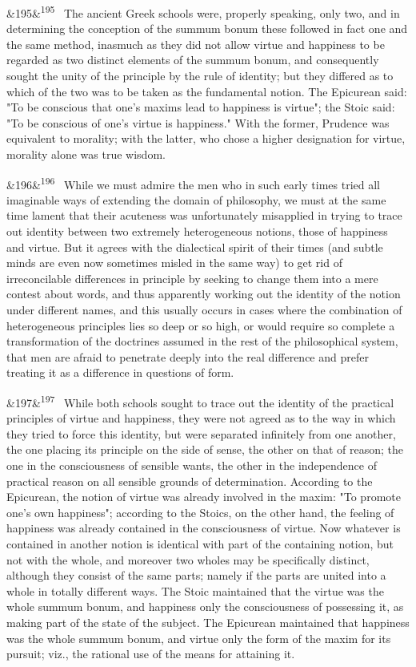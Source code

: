 \documentclass[12pt]{article}
\newcommand{\para}[1][]{\par\noindent\ifx&#1&\else\textsuperscript{\footnotesize #1}~\fi}
\begin{document}
\para[195] The ancient Greek schools were, properly speaking, only two, and in determining the conception of the summum bonum these followed in fact one and the same method, inasmuch as they did not allow virtue and happiness to be regarded as two distinct elements of the summum bonum, and consequently sought the unity of the principle by the rule of identity; but they differed as to which of the two was to be taken as the fundamental notion. The Epicurean said: "To be conscious that one's maxims lead to happiness is virtue"; the Stoic said: "To be conscious of one's virtue is happiness." With the former, Prudence was equivalent to morality; with the latter, who chose a higher designation for virtue, morality alone was true wisdom.

\para[196] While we must admire the men who in such early times tried all imaginable ways of extending the domain of philosophy, we must at the same time lament that their acuteness was unfortunately misapplied in trying to trace out identity between two extremely heterogeneous notions, those of happiness and virtue. But it agrees with the dialectical spirit of their times (and subtle minds are even now sometimes misled in the same way) to get rid of irreconcilable differences in principle by seeking to change them into a mere contest about words, and thus apparently working out the identity of the notion under different names, and this usually occurs in cases where the combination of heterogeneous principles lies so deep or so high, or would require so complete a transformation of the doctrines assumed in the rest of the philosophical system, that men are afraid to penetrate deeply into the real difference and prefer treating it as a difference in questions of form.

\para[197] While both schools sought to trace out the identity of the practical principles of virtue and happiness, they were not agreed as to the way in which they tried to force this identity, but were separated infinitely from one another, the one placing its principle on the side of sense, the other on that of reason; the one in the consciousness of sensible wants, the other in the independence of practical reason on all sensible grounds of determination. According to the Epicurean, the notion of virtue was already involved in the maxim: "To promote one's own happiness"; according to the Stoics, on the other hand, the feeling of happiness was already contained in the consciousness of virtue. Now whatever is contained in another notion is identical with part of the containing notion, but not with the whole, and moreover two wholes may be specifically distinct, although they consist of the same parts; namely if the parts are united into a whole in totally different ways. The Stoic maintained that the virtue was the whole summum bonum, and happiness only the consciousness of possessing it, as making part of the state of the subject. The Epicurean maintained that happiness was the whole summum bonum, and virtue only the form of the maxim for its pursuit; viz., the rational use of the means for attaining it.
\end{document}
